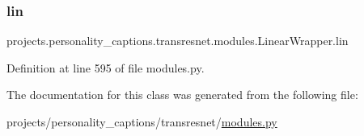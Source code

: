 \subsubsection{\texorpdfstring{lin}{lin}}
{\footnotesize\ttfamily projects.\+personality\+\_\+captions.\+transresnet.\+modules.\+Linear\+Wrapper.\+lin}



Definition at line 595 of file modules.\+py.



The documentation for this class was generated from the following file\+:\begin{DoxyCompactItemize}
\item 
projects/personality\+\_\+captions/transresnet/\hyperlink{projects_2personality__captions_2transresnet_2modules_8py}{modules.\+py}\end{DoxyCompactItemize}
